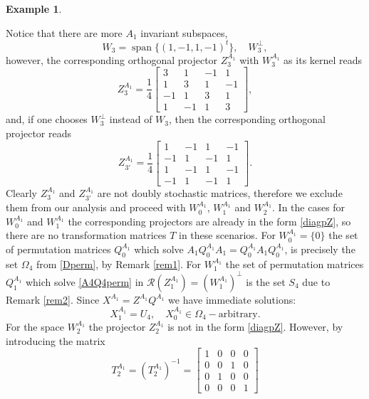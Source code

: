 \documentclass{article}
\theoremstyle{definition}\newtheorem{example}{Example}[section]
\def\R{{\mathcal{R}}}
\begin{document}
\begin{example}
\begin{itemize}
	 	
	 	Notice that there are more $A_1$ invariant subspaces, 
	 	$$W_3=\operatorname{span}\{(1,-1,1,-1)^t\},\quad W_3^\perp,$$
	 	however, the corresponding orthogonal projector $Z^{A_1}_3$ with $W^{A_1}_3$ as its kernel reads
	 	$$ Z^{A_1}_3=\frac{1}{4}\left[\begin{array}{rrrr}3 & 1 & -1 & 1 \\
	 		1 & 3 & 1 & -1\\-1 & 1 & 3 & 1 \\1 & -1 & 1 & 3\end{array}\right],$$
	 		and, if one chooses $W_3^\perp$ instead of $W_3$, then the corresponding orthogonal projector reads
	 		$$Z^{A_1}_{3'}=
	 		\frac{1}{4}\left[\begin{array}{rrrr}1 & -1 & 1 & -1 \\
	 			-1 & 1 & -1 & 1\\1 & -1 & 1 & -1 \\-1 & 1 & -1 & 1\end{array}\right].$$
	 			Clearly $Z^{A_1}_3$ and $Z^{A_1}_{3'}$ are not doubly stochastic matrices, therefore we exclude them from our analysis and proceed with $W^{A_1}_0$, $W^{A_1}_1$ and $W^{A_1}_2$. In the cases for $W^{A_1}_0$ and $W^{A_1}_1$ the corresponding projectors are already in the form \eqref{diagpZ}, so there are no transformation matrices $T$ in these scenarios. For $W_0^{A_1}=\{0\}$ the set of permutation matrices $Q^{A_1}_0$  which solve $A_1Q^{A_1}_0A_1=Q^{A_1}_0A_1Q^{A_1}_0$, is precisely the set $\Omega_4$ from \eqref{Dperm}, by Remark \ref{rem1}. For $W^{A_1}_1$ the set of permutation matrices $Q^{A_1}_1$ which solve \eqref{A4Q4perm} in $\R(Z^{A_1}_1)=\left(W^{A_1}_1\right)^\perp$ is the set $ S_4$ due to Remark \ref{rem2}. Since $X^{A_1}=Z^{A_1}Q^{A_1}$ we have immediate solutions: 
	 			\begin{equation}
	 				\label{A101}
	 				X^{A_1}_1=U_4,\quad X^{A_1}_0\in\Omega_4-\textrm{arbitrary}.
		\end{equation}
		For the space $W^{A_1}_2$ the projector $Z^{A_1}_2$ is not in the form \eqref{diagpZ}. However, by introducing the matrix
		\begin{equation}
			\label{}
			T^{A_1}_2=\left(T^{A_1}_2\right)^{-1}=\left[\begin{array}{cccc}
			1 & 0 & 0 & 0\\0 & 0 & 1 & 0\\ 0 & 1 & 0 & 0\\0 & 0 & 0 & 1			\end{array}\right]
		\end{equation}

\end{itemize}
\end{example}
\end{document}
